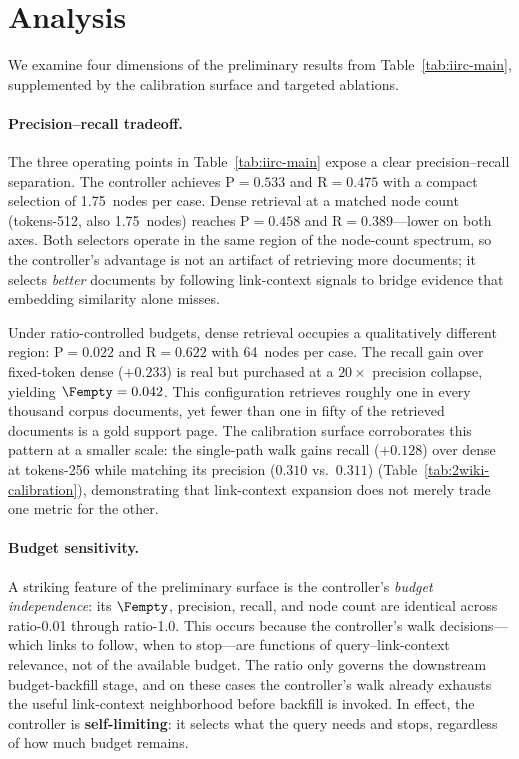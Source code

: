 \section{Analysis}
\label{sec:analysis}

We examine four dimensions of the preliminary \IIRC results from
Table~\ref{tab:iirc-main}, supplemented by the \TwoWikiShort calibration
surface and targeted ablations.

\paragraph{Precision--recall tradeoff.}
The three operating points in Table~\ref{tab:iirc-main} expose a
clear precision--recall separation.
The controller achieves $\mathrm{P} = 0.533$ and $\mathrm{R} = 0.475$
with a compact selection of 1.75~nodes per case.
Dense retrieval at a matched node count (tokens-512, also 1.75~nodes)
reaches $\mathrm{P} = 0.458$ and $\mathrm{R} = 0.389$---lower on
both axes.
Both selectors operate in the same region of the node-count spectrum,
so the controller's advantage is not an artifact of retrieving more
documents; it selects \emph{better} documents by following link-context
signals to bridge evidence that embedding similarity alone misses.

Under ratio-controlled budgets, dense retrieval occupies a qualitatively
different region: $\mathrm{P} = 0.022$ and $\mathrm{R} = 0.622$ with
64~nodes per case.
The recall gain over fixed-token dense ($+0.233$) is real but purchased
at a $20{\times}$ precision collapse, yielding $\Fempty
= 0.042$.
This configuration retrieves roughly one in every thousand corpus
documents, yet fewer than one in fifty of the retrieved documents is
a gold support page.
The \TwoWikiShort calibration surface corroborates this pattern at a smaller
scale: the single-path walk gains recall ($+0.128$) over dense at tokens-256
while matching its precision ($0.310$ vs.\ $0.311$)
(Table~\ref{tab:2wiki-calibration}), demonstrating that link-context expansion
does not merely trade one metric for the other.

\paragraph{Budget sensitivity.}
A striking feature of the preliminary surface is the controller's
\emph{budget independence}: its $\Fempty$, precision,
recall, and node count are identical across ratio-0.01 through ratio-1.0.
This occurs because the controller's walk decisions---which links to
follow, when to stop---are functions of query--link-context relevance,
not of the available budget.
The ratio only governs the downstream budget-backfill stage, and on these
cases the controller's walk already exhausts the useful link-context
neighborhood before backfill is invoked.
In effect, the controller is \textbf{self-limiting}: it selects what the
query needs and stops, regardless of how much budget remains.


